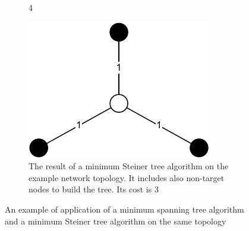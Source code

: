 \begin{figure}
\begin{subfigure}[b]{0.3\textwidth}
{		4}\label{subfig:steiner-minspanning}
	\end{subfigure}
	\begin{subfigure}[b]{0.3\textwidth}
		\centering
		\includegraphics[width=\textwidth]{img/steiner-minsteiner}
		\caption{The result of a minimum Steiner tree algorithm on the
		example network topology. It includes also non-target nodes to
		build the tree. Its cost is 3}\label{subfig:steiner-minsteiner}
	\end{subfigure}
	\caption{An example of application of a minimum spanning tree algorithm
		and a minimum Steiner tree algorithm on the same
		topology}\label{fig:steiner}
\end{figure}

